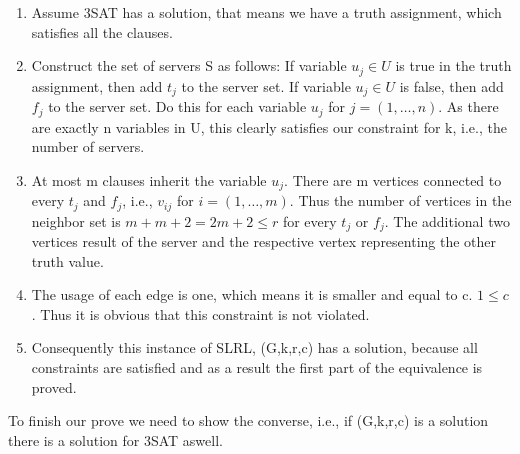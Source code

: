 \documentclass [12pt]{article}
\begin{document}
\begin{enumerate}
  \item{Assume 3SAT has a solution, that means we have a truth assignment, 
    which satisfies all the clauses.}
  \item{Construct the set of servers S as follows: If variable $u_j \in U$ is true
      in the truth assignment, then add $t_j$ to the server set. If variable $u_j \in U$
      is false, then add $f_j$ to the server set. Do this for each variable $u_j$ for $j = (1,\dots,n)$.
      As there are exactly n variables in U, this clearly satisfies our constraint 
    for k, i.e., the number of servers.}
  \item{At most m clauses inherit the variable $u_j$. There are m vertices connected to every
      $t_j$ and $f_j$, i.e., $v_{ij}$ for $i=(1,\dots,m)$.
      Thus the number of vertices in the neighbor set is $m+m+2 = 2m+2 \leq r $ for every 
      $t_j$ or $f_j$. The additional two vertices result of the server and the respective 
    vertex representing the other truth value.}
  \item{The usage of each edge is one, which means it is smaller and equal to c. $1\leq c$.
    Thus it is obvious that this constraint is not violated.}

  \item{Consequently this instance of SLRL, (G,k,r,c) has a solution, because all constraints are satisfied 
    and as a result the first part of the equivalence is proved.}
\end{enumerate}
To finish our prove we need to show the converse, i.e., 
if (G,k,r,c) is a solution there is a solution for 3SAT aswell. 
\end{document}
